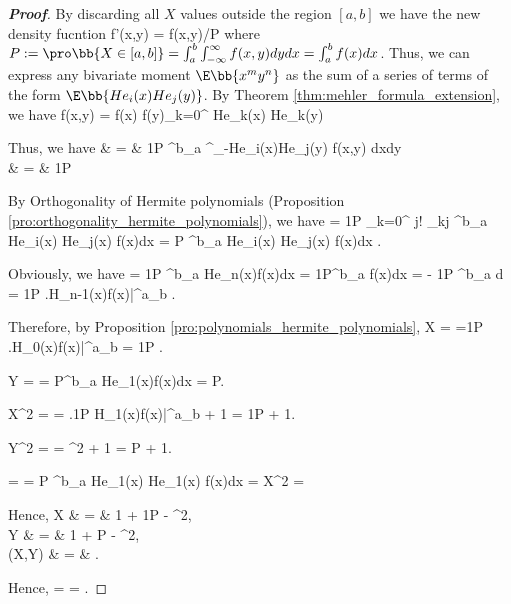 \begin{proof}[\bf Proof]
By discarding all $X$ values outside the region $[a,b]$ we have the new density fucntion \be f'(x,y) = f(x,y)/P \ee where $P := \pro\bb{X\in [a,b]} = \int^b_a \int^\infty_{-\infty} f(x,y) dy dx = \int^b_a f(x)dx$. Thus, we
can express any bivariate moment $\E \bb{x^my^n}$ as the sum of a series of terms of the form $\E \bb{He_i(x)He_j(y)}$. By Theorem \ref{thm:mehler_formula_extension}, we have \be f(x,y) = f(x) f(y)\sum_{k=0}^\infty
{} He_k(x) He_k(y)\ee


Thus, we have \beast \E {} & = & \frac 1P \int^b_a \int^\infty_{-\infty}He_i(x)He_j(y) f(x,y) dxdy \\
& = & \frac 1P  \eeast

By Orthogonality of Hermite polynomials (Proposition \ref{pro:orthogonality_hermite_polynomials}), we have \be \E {} =  \frac 1P \sum_{k=0}^\infty {} \sqrt{2 \pi} j! \delta_{kj} \int^b_a
He_i(x) He_j(x) f(x)dx  = P \int^b_a He_i(x) He_j(x) f(x)dx . \ee

Obviously, we have \be  \E{} = \frac 1P \int^b_a He_n(x)f(x)dx = \frac 1P\int^b_a f(x)dx = - \frac 1P \int^b_a d = \frac 1P \left.H_{n-1}(x)f(x)\right|^a_b\nonumber
.\ee

Therefore, by Proposition \ref{pro:polynomials_hermite_polynomials}, \be \E X =  \E{} =\frac 1P \left.H_0(x)f(x)\right|^a_b = \frac 1P . \ee

\be \E Y =  \E{} =  \frac {\rho}P\int^b_a He_1(x)f(x)dx  = \frac {\rho}P. \ee

\be \E X^2 = \E{} = \left.\frac 1P H_1(x)f(x)\right|^a_b + 1 = \frac 1P  + 1.\ee

\be \E Y^2 = \E{} = \rho^2 \E{} + 1 = P  + 1.\ee

\be \E {} = \E{} = \frac {\rho}P \int^b_a He_1(x) He_1(x) f(x)dx = \rho \E X^2 = \rho{} \ee


Hence, \beast \var X & = & 1 + \frac 1P   - ^2,\\
\var Y & = & 1 + P  - ^2,\\
\cov(X,Y) & = & \rho{} . \eeast

Hence, \be \wh{\rho} =  = \rho{}. \ee
\end{proof}

